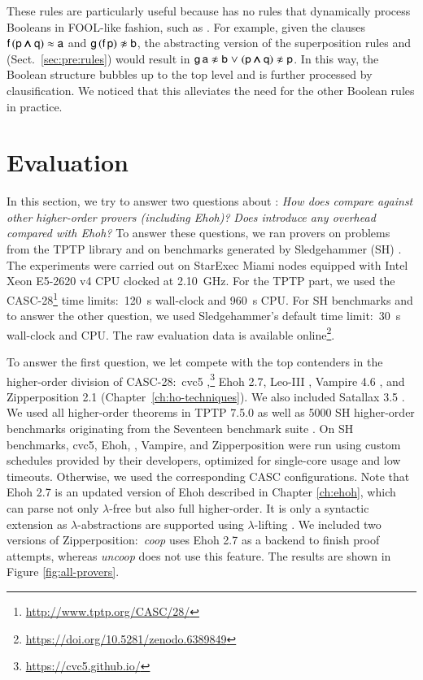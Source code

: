   These rules are particularly useful because \ehohii{} has no rules that dynamically
  process Booleans in FOOL-like fashion, such as . For example,
  given the clauses $\mathsf{f} \, (\mathsf{p} \pmb{\land} \mathsf{q})\allowbreak \approx \mathsf{a}$ and
  $\cst{g} \, (\cst{f} \, \cst{p}) \noteq \cst{b}$, the abstracting version of the
  superposition rules  and  (Sect.~\ref{sec:pre:rules}) would result in $\cst{g} \, \cst{a} \noteq \cst{b} \llor (\cst{p}
  \iand \cst{q}) \noteq \cst{p}$. In this way, the Boolean structure bubbles up to
  the top level and is further processed by clausification. We noticed that this
  alleviates the need for the other Boolean rules in practice.

  \section{Evaluation}
  \label{sec:ehoh2:eval}
  
  In this section, we try to answer two questions about \ehohii{}: \emph{How does
  \ehohii{} compare against other higher-order provers (including Ehoh)?} \emph{Does
  \ehohii{} introduce any overhead compared with Ehoh?} To answer
  these questions, we ran provers on problems from the TPTP library \cite{gs-17-tptp} and on
  benchmarks generated by Sledgehammer (SH) \cite{pb-12-sh}.
  The experiments were carried out on StarExec Miami
  \cite{sst-14-starexec} nodes equipped with Intel Xeon E5-2620 v4 CPU clocked at
  2.10~GHz. For the TPTP part, we used the CASC-28\footnote{\url{http://www.tptp.org/CASC/28/}} time limits:\ 120~s
  wall-clock and 960~s CPU. For SH benchmarks and to answer the other question, we used Sledgehammer's
  default time limit:\ 30~s wall-clock and CPU.  The raw evaluation data is available online\footnote{\url{https://doi.org/10.5281/zenodo.6389849}}.

  
  To answer the first question, we let
  \ehohii{} compete with the top contenders in the higher-order division of
  CASC-28:\ cvc5 ,\footnote{\url{https://cvc5.github.io/}}
  Ehoh 2.7, Leo-III  \cite{sb-21-leo3}, Vampire 4.6
  \cite{br-20-full-sup-w-combs}, and Zipperposition 2.1 (Chapter~\ref{ch:ho-techniques}). 
  We also included Satallax 3.5
  \cite{cb-12-satallax}. We used all  higher-order
  theorems in TPTP 7.5.0 as well as 5000 SH higher-order benchmarks
  originating from the Seventeen benchmark suite \cite{desharnais-et-al-202x}.
  On SH benchmarks,
  cvc5, Ehoh, \ehohii{}, Vampire, and Zipperposition were run using custom schedules provided by
  their developers, optimized for single-core usage and low timeouts.
  Otherwise, we used the corresponding CASC configurations.
  Note that Ehoh 2.7 is an updated version of Ehoh described in Chapter
  \ref{ch:ehoh}, which can parse not only $\lambda$-free but also full
  higher-order. It is only a syntactic extension as $\lambda$-abstractions are supported using $\lambda$-lifting \cite{rjmh-82-lifting}.
  We included two versions of Zipperposition:\ \emph{coop} uses Ehoh 2.7 as a backend to finish proof attempts,
  whereas \emph{uncoop} does not use this feature. The results
  are shown in Figure \ref{fig:all-provers}.
  

